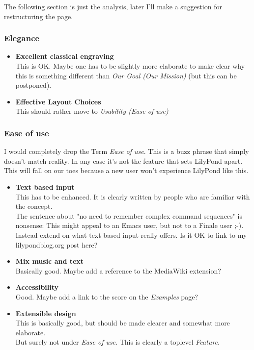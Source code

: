 \documentclass[10pt,a4paper,]{article}
\begin{document}
The following section is just the analysis, later I'll make a suggestion for restructuring the page.

\subsubsection*{Elegance}
\begin{itemize}
\item \textbf{Excellent classical engraving}\\
This is OK. Maybe one has to be slightly more elaborate to make clear why this is something different than \emph{Our Goal (Our Mission)} (but this can be postponed).
\item \textbf{Effective Layout Choices}\\
This should rather move to \emph{Usability (Ease of use)}
\end{itemize}

\subsubsection*{Ease of use}
I would completely drop the Term \emph{Ease of use}.
This is a buzz phrase that simply doesn't match reality.
In any case it's not the feature that sets LilyPond apart.
This will fall on our toes because a new user won't experience LilyPond like this.\\

\begin{itemize}
\item \textbf{Text based input}\\
This has to be enhanced.
It is clearly written by people who are familiar with the concept.\\
The sentence about "no need to remember complex command sequences" is nonsense: This might appeal to an Emacs user, but not to a Finale user ;-).
Instead extend on what text based input really offers.
Is it OK to link to my lilypondblog.org post here?
\item \textbf{Mix music and text}\\
Basically good.
Maybe add a reference to the MediaWiki extension?
\item \textbf{Accessibility}\\
Good.
Maybe add a link to the score on the \emph{Examples} page?
\item \textbf{Extensible design}\\
This is basically good, but should be made clearer and somewhat more elaborate.\\
But surely not under \emph{Ease of use}.
This is clearly a toplevel \emph{Feature}.
\end{itemize}
\end{document}
